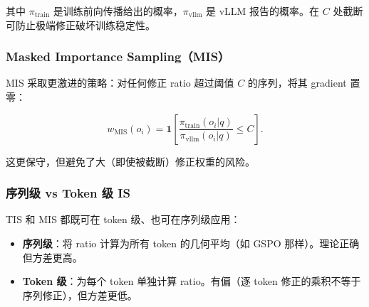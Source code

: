 其中 $\pi_{\text{train}}$ 是训练前向传播给出的概率，$\pi_{\text{vllm}}$ 是 vLLM 报告的概率。在 $C$ 处截断可防止极端修正破坏训练稳定性。

\subsubsection*{Masked Importance Sampling（MIS）}
\label{masked-importance-sampling-mis}

MIS 采取更激进的策略：对任何修正 ratio 超过阈值 $C$ 的序列，将其 gradient 置零：

\[
w_{\text{MIS}}(o_i) = \mathbf{1}\!\left[\frac{\pi_{\text{train}}(o_i|q)}{\pi_{\text{vllm}}(o_i|q)} \le C\right].
\]

这更保守，但避免了大（即使被截断）修正权重的风险。

\subsubsection*{序列级 vs Token 级 IS}
\label{sequence-level-vs-token-level-is}

TIS 和 MIS 都既可在 token 级、也可在序列级应用：

\begin{itemize}
  \item \textbf{序列级}：将 ratio 计算为所有 token 的几何平均（如 GSPO 那样）。理论正确但方差更高。
  \item \textbf{Token 级}：为每个 token 单独计算 ratio。有偏（逐 token 修正的乘积不等于序列修正），但方差更低。
\end{itemize}

